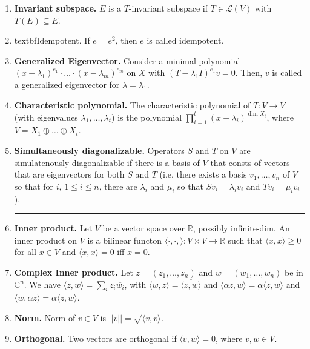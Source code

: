 \begin{enumerate}
	\item \textbf{Invariant subspace. } $E$ is a $T$-invariant subspace if $T \in \mathscr{L}(V)$ with $T(E) \subseteq E$. 
	\item textbf{Idempotent. } If $e = e^2$, then $e$ is called idempotent. 
	\item \textbf{Generalized Eigenvector. } Consider a minimal polynomial $(x-\lambda_1)^{e_1} \cdot \dots \cdot (x-\lambda_m)^{e_m}$ on $X$ with $(T-\lambda_1I)^{e_1}v = 0$. Then, $v$ is called a generalized eigenvector for $\lambda = \lambda_1$. 
	\item \textbf{Characteristic polynomial. } The characteristic polynomial of $T: V \to V$ (with eigenvalues $\lambda_1,\dots,\lambda_t$) is the polynomial $\prod_{i=1}^{t} (x-\lambda_i)^{\dim X_i}$, where $V = X_1 \oplus \dots \oplus X_t$. 
	\item \textbf{Simultaneously diagonalizable. } Operators $S$ and $T$ on $V$ are simulatenously diagonalizable if there is a basis of $V$ that consts of vectors that are eigenvectors for both $S$ and $T$ (i.e. there exists a basis $v_1,\dots,v_n$ of $V$ so that for $i$, $1 \leq i \leq n$, there are $\lambda_i$ and $\mu_i$ so that $Sv_i = \lambda_iv_i$ and $Tv_i = \mu_iv_i$). 
	\begin{center}
		\hrule
	\end{center}
	\item \textbf{Inner product. } Let $V$ be a vector space over $\mathbb{R}$, possibly infinite-dim. An inner product on $V$ is a bilinear functon $\langle \cdot, \cdot, \rangle: V \times V \to \mathbb{R}$ such that $\langle x, x \rangle \geq 0$ for all $x \in V$ and $\langle x, x \rangle = 0$ iff $x =0$. 
	\item \textbf{Complex Inner product. } Let $z=(z_1,\dots,z_n)$ and $w=(w_1,\dots,w_n)$ be in $\mathbb{C}^n$. We have $\langle z, w \rangle = \sum_{i} z_i \overline{w_i}$, with $\langle w, z \rangle = \overline{\langle z, w \rangle}$ and $\langle \alpha z, w \rangle = \alpha \langle z, w \rangle$ and $\langle w, \alpha z \rangle = \overline{\alpha}\langle z, w \rangle$. 
	\item \textbf{Norm. } Norm of $v \in V$ is $||v|| = \sqrt{\langle v, v \rangle}$. 
	\item \textbf{Orthogonal. } Two vectors are orthogonal if $\langle v,w \rangle = 0$, where $v,w \in V$. 
\end{enumerate}


